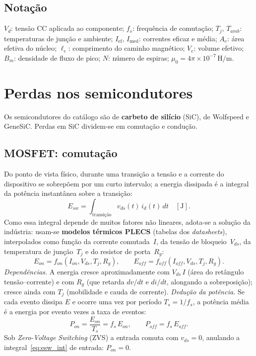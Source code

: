 \documentclass[
	a4paper, 12pt,
	chapter=TITLE, section=Title, subsection=Title,
	oneside, english, brazil, fleqn
]{abntex2}
\begin{document}
\section{Notação}
$V_d$: tensão CC aplicada ao componente; $f_s$: frequência de comutação;
$T_j,\,T_{amb}$: temperaturas de junção e ambiente; $I_{\mathrm{ef}},\,I_{\mathrm{med}}$:
correntes eficaz e média; $A_e$: área efetiva do núcleo; $\ell_e$: comprimento do
caminho magnético; $V_e$: volume efetivo; $B_m$: densidade de fluxo de pico; $N$:
número de espiras; $\mu_0=4\pi\times10^{-7}\,\si{\henry\per\meter}$.

\chapter{Perdas nos semicondutores}
Os semicondutores do catálogo são de \textbf{carbeto de silício} (SiC), de
Wolfspeed e GeneSiC. Perdas em SiC dividem-se em comutação e condução.

\section{MOSFET: comutação}
Do ponto de vista físico, durante uma transição a tensão e a corrente do dispositivo
se sobrepõem por um curto intervalo; a energia dissipada é a integral da potência
instantânea sobre a transição:
\begin{equation}
	E_{sw}=\int_{\text{transição}} v_{ds}(t)\,i_d(t)\,dt\quad[\si{\joule}].
	\label{eq:esw_int}
\end{equation}
Como essa integral depende de muitos fatores não lineares, adota-se a solução da
indústria: usam-se \textbf{modelos térmicos PLECS} (tabelas dos
\emph{datasheets}), interpolados como função da corrente comutada~$I$, da tensão
de bloqueio~$V_{ds}$, da temperatura de junção~$T_j$ e do resistor de porta~$R_g$:
\begin{equation}
	E_{on}=f_{on}(I_{on},V_{ds},T_j,R_g),\qquad
	E_{off}=f_{off}(I_{off},V_{ds},T_j,R_g).
	\label{eq:eon}
\end{equation}
\textit{Dependências.} A energia cresce aproximadamente com $V_{ds}\,I$ (área do
retângulo tensão--corrente) e com $R_g$ (que retarda $dv/dt$ e $di/dt$, alongando
a sobreposição); cresce ainda com $T_j$ (mobilidade e cauda de corrente).
\textit{Dedução da potência.} Se cada evento dissipa $E$ e ocorre uma vez por
período $T_s=1/f_s$, a potência média é a energia por evento vezes a taxa de
eventos:
\begin{equation}
	P_{on}=\frac{E_{on}}{T_s}=f_s\,E_{on},\qquad P_{off}=f_s\,E_{off}.
	\label{eq:pon}
\end{equation}
Sob \emph{Zero-Voltage Switching} (ZVS) a entrada comuta com $v_{ds}=0$, anulando
a integral~\eqref{eq:esw_int} de entrada: $P_{on}=0$.
\end{document}

